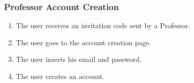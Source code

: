 \subsubsection{Professor Account Creation}

\begin{enumerate}
    \item The user receives an invitation code sent by a Professor.
    \item The user goes to the account creation page.
    \item The user inserts his email and password.
    \item The user creates an account.
\end{enumerate}